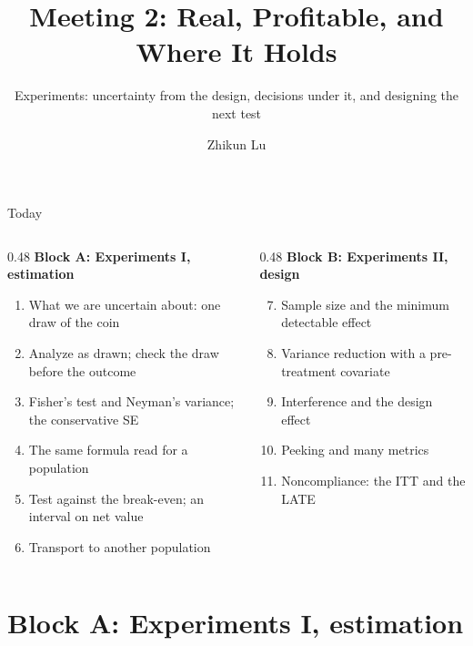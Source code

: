 \documentclass[aspectratio=169, 11pt, handout]{beamer}
\title[Meeting 2]{Meeting 2: Real, Profitable, and Where It Holds}
\subtitle{Experiments: uncertainty from the design, decisions under it, and designing the next test}
\author{Zhikun Lu}
\date{}
\begin{document}
\begin{frame}
\titlepage
\end{frame}

\begin{frame}{Today}

\begin{columns}[T]
\begin{column}{0.48\textwidth}
\textbf{Block A: Experiments I, estimation}
\begin{enumerate}
  \item What we are uncertain about: one draw of the coin
  \item Analyze as drawn; check the draw before the outcome
  \item Fisher's test and Neyman's variance; the conservative SE
  \item The same formula read for a population
  \item Test against the break-even; an interval on net value
  \item Transport to another population
\end{enumerate}
\end{column}
\begin{column}{0.48\textwidth}
\textbf{Block B: Experiments II, design}
\begin{enumerate}
  \setcounter{enumi}{6}
  \item Sample size and the minimum detectable effect
  \item Variance reduction with a pre-treatment covariate
  \item Interference and the design effect
  \item Peeking and many metrics
  \item Noncompliance: the ITT and the LATE
\end{enumerate}
\end{column}
\end{columns}
\end{frame}

\section{Block A: Experiments I, estimation}
\end{document}
